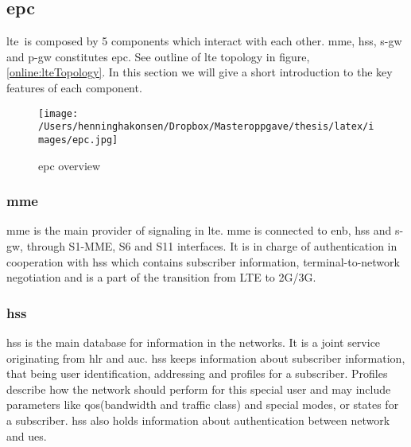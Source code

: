 \documentclass[USenglish]{ifimaster}  %
\begin{document}
\subsection{\acrlong{epc}}
\acrshort{lte} is composed by 5 components which interact with each other. \acrshort{mme}, \acrshort{hss}, \acrshort{s-gw} and \acrshort{p-gw} constitutes \acrfull{epc}. See outline of \acrshort{lte} topology in figure, \vref{online:lteTopology}. In this section we will give a short introduction to the key features of each component.

\begin{figure}[H]
  \centering\texttt{[image: /Users/henninghakonsen/Dropbox/Masteroppgave/thesis/latex/images/epc.jpg]}
  \caption[\acrlong{epc} overview]{\acrlong{epc} overview \cite{online:lteTopology}}
  \label{online:lteTopology}
\end{figure}

\subsubsection{\acrshort{mme}}
\acrfull{mme} is the main provider of signaling in \acrshort{lte}. \acrshort{mme} is connected to \acrshort{enb}, \acrshort{hss} and \acrshort{s-gw}, through S1-MME, S6 and S11 interfaces. It is in charge of authentication in cooperation with \acrshort{hss} which contains subscriber information, terminal-to-network negotiation and is a part of the transition from LTE to 2G/3G.

\subsubsection{\acrshort{hss}}
\acrfull{hss} is the main database for information in the networks. It is a joint service originating from \acrfull{hlr} and \acrfull{auc}. \acrshort{hss} keeps information about subscriber information, that being user identification, addressing and profiles for a subscriber. Profiles describe how the network should perform for this special user and may include parameters like \acrshort{qos}(bandwidth and traffic class) and special modes, or states for a subscriber.
\newline
\acrshort{hss} also holds information about authentication between network and \acrshort{ue}s.
\end{document}
